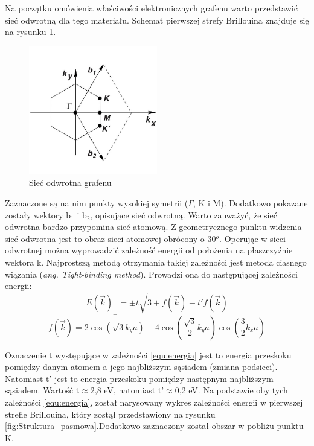 	Na początku omówienia właściwości elektronicznych grafenu warto przedstawić sieć odwrotną dla tego materiału.
	Schemat pierwszej strefy Brillouina znajduje się na rysunku \ref{fig:siec_odwrotna}.
	
	\vspace{-10pt}
	\begin{figure}[ht]
	\centering
	\includegraphics[width=0.50\textwidth]{./Rozdzial_2/obrazki/Siec_odwrotna.jpg}
	\caption{Sieć odwrotna grafenu}
	\label{fig:siec_odwrotna}
	\end{figure}
	\vspace{-10pt}
	Zaznaczone są na nim punkty wysokiej symetrii ($\Gamma$, K i M). Dodatkowo pokazane zostały wektory b$_1$ i b$_2$, 
	opisujące sieć odwrotną. Warto zauważyć, że sieć odwrotna bardzo przypomina sieć atomową. Z geometrycznego punktu
	widzenia sieć odwrotna jest to obraz sieci atomowej obrócony o 30$^o$. 
	Operując w sieci odwrotnej można wyprowadzić zależność energii od położenia na płaszczyźnie wektora k. Najprostszą
	metodą otrzymania takiej zależności jest metoda ciasnego wiązania (\textit{ang. Tight-binding method}). Prowadzi ona
	do następującej zależności energii:
	\begin{equation}
    		E(\vec k)_{\pm}=\pm t \sqrt{3+f(\vec k)} - t'f(\vec k)
		\label{equ:energia}
	\end{equation}
	\begin{equation}
    		f(\vec k)= 2\cos({\sqrt{3}k_y a}) + 4\cos \left (\frac{\sqrt{3}}{2} k_y a \right )\cos \left (\frac{3}{2}k_xa \right )
	\end{equation}

	Oznaczenie t występujące w zależności \ref{equ:energia} jest to energia przeskoku pomiędzy danym atomem a 
	jego najbliższym sąsiadem (zmiana podsieci). Natomiast t' jest to energia przeskoku pomiędzy następnym najbliższym
	sąsiadem. Wartość t$\approx$2,8 eV, natomiast t'$\approx$0,2 eV. Na podstawie oby tych zależności \ref{equ:energia}, został narysowany wykres zależności energii w pierwszej strefie Brillouina, który zostął przedstawiony na rysunku \ref{fig:Struktura_pasmowa}.Dodatkowo zaznaczony został obszar w pobliżu punktu K.

